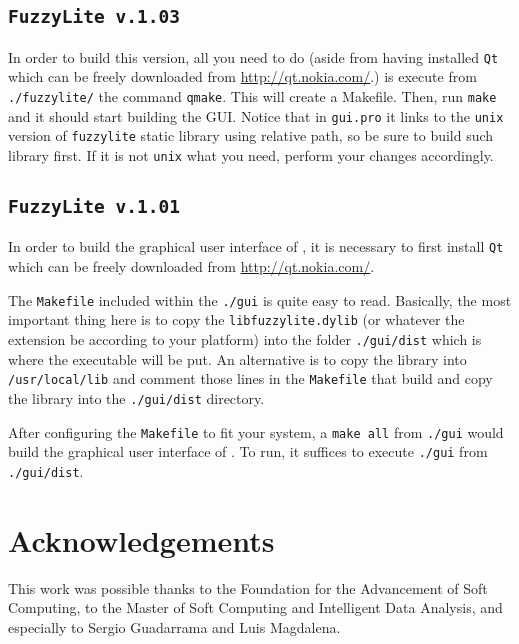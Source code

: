 	\subsection{\texttt{FuzzyLite v.1.03}}
	In order to build this version, all you need to do (aside from having
	installed \texttt{Qt} which can be freely downloaded from
\url{http://qt.nokia.com/}.) is execute from \texttt{./fuzzylite/} the command
\texttt{qmake}. This will create a Makefile. Then, run \texttt{make} and it
should start building the GUI. Notice that in \texttt{gui.pro} it links
 to the \texttt{unix} version of \texttt{fuzzylite} static library using
 relative path, so be sure to build such library first. If it is not
 \texttt{unix} what you need, perform your changes accordingly.

	\subsection{\texttt{FuzzyLite v.1.01}}
In order to build the graphical user interface of \fl, it is necessary to first
install \texttt{Qt} which can be freely downloaded from
\url{http://qt.nokia.com/}.
	
The \texttt{Makefile} included within the \texttt{./gui} is quite easy to read.
Basically, the most important thing here is to copy the
\texttt{libfuzzylite.dylib} (or whatever the extension be according to your
platform) into the folder \texttt{./gui/dist} which is where the executable will
be put. An alternative is to copy the library into \texttt{/usr/local/lib} and
comment those lines in the \texttt{Makefile} that build and copy the library
into the \texttt{./gui/dist} directory.
	
After configuring the \texttt{Makefile} to fit your system, a \texttt{make all}
from \texttt{./gui} would build the graphical user interface of \fl. To run, it
suffices to execute \texttt{./gui} from \texttt{./gui/dist}.
	
	\section{Acknowledgements}
This work was possible thanks to the Foundation for the Advancement of Soft
Computing, to the Master of Soft Computing and Intelligent Data Analysis, and
especially to Sergio Guadarrama and Luis Magdalena.

